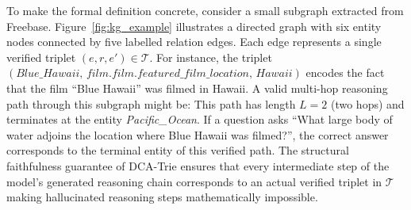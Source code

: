 To make the formal definition concrete, consider a small subgraph extracted from Freebase. Figure~\ref{fig:kg_example} illustrates a directed graph with six entity nodes connected by five labelled relation edges. Each edge represents a
single verified triplet $(e, r, e') \in \mathcal{T}$. For instance, the triplet $(\textit{Blue\_Hawaii},\, \textit{film.film.featured\_film\_location},\,\textit{Hawaii})$ encodes the fact that the film ``Blue Hawaii'' was filmed
in Hawaii. A valid multi-hop reasoning path through this subgraph might be:
This path has length $L = 2$ (two hops) and terminates at the entity \textit{Pacific\_Ocean}. If a question asks ``What large body of water adjoins the location where Blue Hawaii was filmed?'', the correct answer corresponds to
the terminal entity of this verified path. The structural faithfulness guarantee of DCA-Trie ensures that every intermediate step of the model's generated reasoning chain corresponds to an actual verified triplet in $\mathcal{T}$
making hallucinated reasoning steps mathematically impossible.

